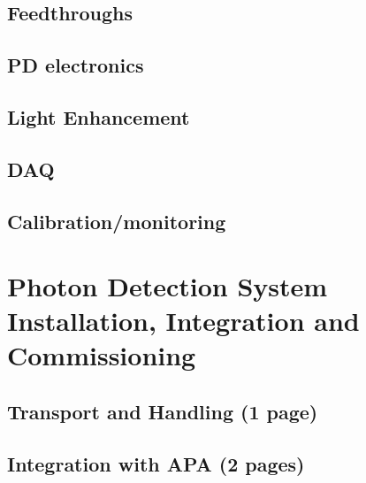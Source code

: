 \subsection{Feedthroughs}
\label{sec:fdsp-pd-intfc-feed}

\subsection{PD electronics}
\label{sec:fdsp-pd-intfc-feed}

\subsection{Light Enhancement}
\label{sec:fdsp-pd-intfc-le}

\subsection{DAQ}
\label{sec:fdsp-pd-intfc-daq}

\subsection{Calibration/monitoring}
\label{sec:fdsp-pd-intfc-calib}




\section{Photon Detection System Installation, Integration and Commissioning}
\label{sec:fdsp-pd-install}

\subsection{Transport and Handling (1 page)}
\label{sec:fdsp-pd-install-transport}


\subsection{Integration with APA  (2 pages)}
\label{sec:fdsp-pd-install-pd-apa}


